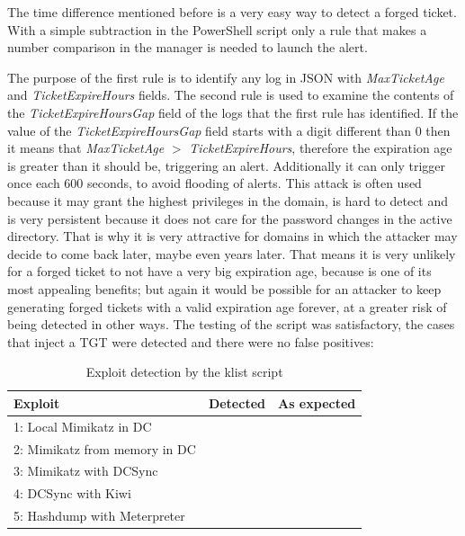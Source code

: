 \linej
The time difference mentioned before is a very easy way to detect a forged ticket. With a simple subtraction in the PowerShell script only a rule that makes a number comparison in the manager is needed to launch the alert.
\linej

\linej
The purpose of the first rule is to identify any log in JSON with \textit{MaxTicketAge} and \textit{TicketExpireHours} fields. The second rule is used to examine the contents of the \textit{TicketExpireHoursGap} field of the logs that the first rule has identified. If the value of the \textit{TicketExpireHoursGap} field starts with a digit different than 0 then it means that \textit{MaxTicketAge} $>$ \textit{TicketExpireHours}, therefore the expiration age is greater than it should be, triggering an alert.
Additionally it can only trigger once each 600 seconds, to avoid flooding of alerts.
\linej
\linej
This attack is often used because it may grant the highest privileges in the domain, is hard to detect and is very persistent because it does not care for the password changes in the active directory. That is why it is very attractive for domains in which the attacker may decide to come back later, maybe even years later. That means it is very unlikely for a forged ticket to not have a very big expiration age, because is one of its most appealing benefits; but again it would be possible for an attacker to keep generating forged tickets with a valid expiration age forever, at a greater risk of being detected in other ways.
\linej
\linej
The testing of the script was satisfactory, the cases that inject a TGT were detected and there were no false positives:
\begin{table}[H]
	\centering
	\begin{tabular}{|l|l|l|}
		\hline
		\rowcolor{gray!30}
		Exploit & Detected & As expected \\ \hline
		1: Local Mimikatz in DC& \RYES& \RYES\\ \hline
		2: Mimikatz from memory in DC& \RYES& \RYES\\ \hline
		3: Mimikatz with DCSync& \RYES& \RYES\\ \hline
		4: DCSync with Kiwi& \RNO& \RYES\\ \hline
		5: Hashdump with Meterpreter& \RNO& \RYES\\ \hline
	\end{tabular}
	\caption{Exploit detection by the klist script}
\end{table}

